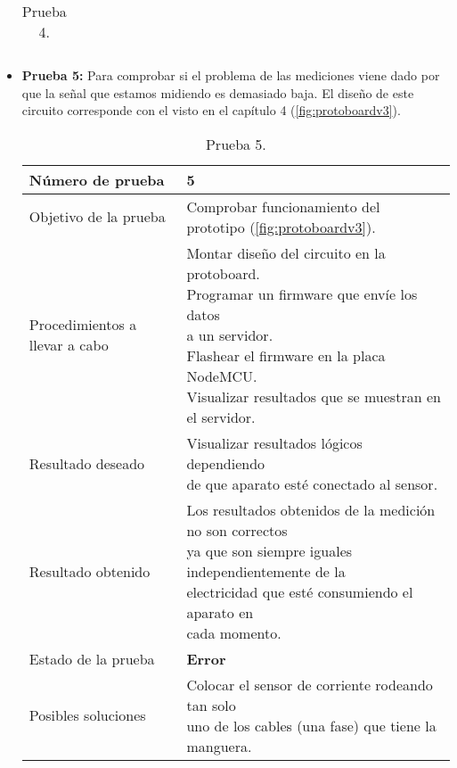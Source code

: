 \begin{itemize}
\begin{table}[H]
\begin{center}
\begin{tabular}{|l|l|}
			\end{tabular}
			\caption{Prueba 4.}
			\label{tabla:prueba4}
		\end{center}
	\end{table}

	\vspace{7cm}

	\item \textbf{Prueba 5:} Para comprobar si el problema de las mediciones viene dado por que la señal que estamos midiendo es demasiado baja. El diseño de este circuito corresponde con el visto en el capítulo 4 (\ref{fig:protoboardv3}).

	\begin{table}[H]
		\begin{center}
			\begin{tabular}{|l|l|}
				\hline
				Número de prueba &  5 \\ \hline 
				Objetivo de la prueba &  Comprobar funcionamiento del prototipo (\ref{fig:protoboardv3}). \\ \hline 
				Procedimientos a llevar a cabo &  \makecell[l]{\tabitem Montar diseño del circuito en la protoboard. \\ \tabitem Programar un firmware que envíe los datos \\ a un servidor.
				\\ \tabitem Flashear el firmware en la placa NodeMCU.
				\\ \tabitem Visualizar resultados que se muestran en el servidor.}
				\\ \hline 
				Resultado deseado &  \makecell[l]{Visualizar resultados lógicos dependiendo \\ de que aparato esté conectado al sensor.} \\ \hline 
				Resultado obtenido &  \makecell[l]{Los resultados obtenidos de la medición no son correctos \\ ya que son siempre iguales independientemente de la \\electricidad que esté consumiendo el aparato en\\ cada momento.} \\ \hline 
				Estado de la prueba &  \textbf{Error} \\ \hline 
				Posibles soluciones &  \makecell[l]{Colocar el sensor de corriente rodeando tan solo \\ uno de los cables (una fase) que tiene la manguera.} \\ \hline 
				
			\end{tabular}
			\caption{Prueba 5.}
			\label{tabla:prueba5}
		\end{center}
	\end{table}
	

\end{itemize}
